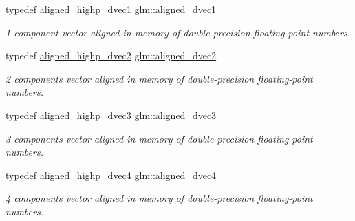 \begin{DoxyCompactItemize}
typedef \hyperlink{group__gtc__type__aligned_ga85671dcb7eef983b5035273fe78dd963}{aligned\+\_\+highp\+\_\+dvec1} \hyperlink{group__gtc__type__aligned_ga81fe4410dc880770293c53fcba83c9e4}{glm\+::aligned\+\_\+dvec1}
\begin{DoxyCompactList}\small\item\em 1 component vector aligned in memory of double-\/precision floating-\/point numbers. \end{DoxyCompactList}\item 
\mbox{\label{group__gtc__type__aligned_ga1e6972e837bc34b3424af8d63a71d7c6}} 
typedef \hyperlink{group__gtc__type__aligned_gadc0edec95aa740d8ec351ef1e2dd39de}{aligned\+\_\+highp\+\_\+dvec2} \hyperlink{group__gtc__type__aligned_ga1e6972e837bc34b3424af8d63a71d7c6}{glm\+::aligned\+\_\+dvec2}
\begin{DoxyCompactList}\small\item\em 2 components vector aligned in memory of double-\/precision floating-\/point numbers. \end{DoxyCompactList}\item 
\mbox{\label{group__gtc__type__aligned_ga82da11893fbac3bda647c9de9da62693}} 
typedef \hyperlink{group__gtc__type__aligned_gafb21f8db25007665c2cb2a9b250471aa}{aligned\+\_\+highp\+\_\+dvec3} \hyperlink{group__gtc__type__aligned_ga82da11893fbac3bda647c9de9da62693}{glm\+::aligned\+\_\+dvec3}
\begin{DoxyCompactList}\small\item\em 3 components vector aligned in memory of double-\/precision floating-\/point numbers. \end{DoxyCompactList}\item 
\mbox{\label{group__gtc__type__aligned_ga502d8d084a488118c9a5466d73ba1a46}} 
typedef \hyperlink{group__gtc__type__aligned_ga4b7b03b9178c6f0574c26181a054beec}{aligned\+\_\+highp\+\_\+dvec4} \hyperlink{group__gtc__type__aligned_ga502d8d084a488118c9a5466d73ba1a46}{glm\+::aligned\+\_\+dvec4}
\begin{DoxyCompactList}\small\item\em 4 components vector aligned in memory of double-\/precision floating-\/point numbers. \end{DoxyCompactList}\item 
\mbox{\label{group__gtc__type__aligned_ga1b85bcaa9f7caaec77f3a31d35669a98}} 

\end{DoxyCompactItemize}

